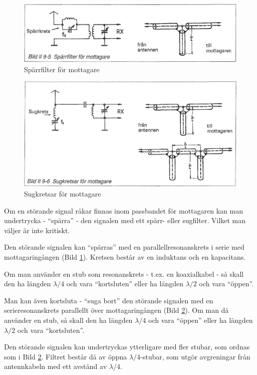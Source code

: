 \begin{figure}
  \includegraphics[width=\textwidth]{images/bild_2_9-05}
  \caption{Spärrfilter för mottagare}
  \label{fig:bildII9-5}
\end{figure}

\begin{figure}
  \includegraphics[width=\textwidth]{images/bild_2_9-06}
  \caption{Sugkretsar för mottagare}
  \label{fig:bildII9-6}
\end{figure}

Om en störande signal råkar finnas inom passbandet för mottagaren kan
man undertrycka - ``spärra'' - den signalen med ett spärr- eller
sugfilter. Vilket man väljer är inte kritiskt.

Den störande signalen kan ``spärras'' med en parallellresonanskrets i
serie med mottagaringången (Bild \ref{fig:bildII9-5}). Kretsen består av en induktans
och en kapacitans.

Om man använder en stub som resonanskrets - t.ex. en koaxialkabel - så
skall den ha längden \(\lambda/4\) och vara ``kortsluten'' eller ha
längden \(\lambda/2\) och vara ``öppen''.

Man kan även kortsluta - ``suga bort'' den störande signalen med en
serieresonanskrets parallellt över mottagaringången (Bild \ref{fig:bildII9-6}). Om
man då använder en stub, så skall den ha längden \(\lambda/4\) och
vara ``öppen'' eller ha längden \(\lambda/2\) och vara ``kortsluten''.

Den störande signalen kan undertryckas ytterligare med fler stubar,
som ordnas som i Bild \ref{fig:bildII9-6}. Filtret består då av öppna
\(\lambda/4\)-stubar, som utgör avgreningar från antennkabeln med ett
avstånd av \(\lambda/4\).

